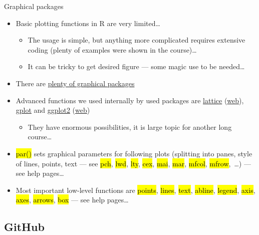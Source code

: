 \documentclass[compress, ucs, xelatex, 11pt, xcolor=svgnames,
	hyperref={
		bookmarks=true,
		unicode=true,
		colorlinks=true,
		pdftitle={Molecular data in R},
		plainpages=false,
		pdfauthor={Vojtech Zeisek},
		pdfsubject={Course about phylogeny and evolution in R},
		pdfcreator={XeLaTeX},
		pdfkeywords={R, evolution, phylogeny, molecular data},
		linkcolor=Tomato,
		anchorcolor=SaddleBrown,
		citecolor=Goldenrod,
		filecolor=DarkMagenta,
		menucolor=Sienna,
		urlcolor=DarkTurquoise,
		pdftex},
	url={hyphens, lowtilde} %
	]{beamer}
\renewcommand{\texttt}[1]{\hl{\ttfamily #1}}
\begin{document}
\begin{frame}{Graphical packages}
	\begin{itemize}
		\item Basic plotting functions in R are very limited\ldots
		\begin{itemize}
			\item The usage is simple, but anything more complicated requires extensive coding (plenty of examples were shown in the course)\ldots
			\item It can be tricky to get desired figure --- some magic use to be needed\ldots
		\end{itemize}
		\item There are \href{https://CRAN.R-project.org/web/views/Graphics.html}{plenty of graphical packages}
		\item Advanced functions we used internally by used packages are \href{https://CRAN.R-project.org/package=lattice}{lattice} (\href{http://lattice.r-forge.r-project.org/}{web}), \href{https://CRAN.R-project.org/package=gplots}{gplot} and \href{https://CRAN.R-project.org/package=ggplot2}{ggplot2} (\href{https://ggplot2.tidyverse.org/}{web})
		\begin{itemize}
			\item They have enormous possibilities, it is large topic for another long course\ldots
		\end{itemize}
		\item \texttt{par()} sets graphical parameters for following plots (splitting into panes, style of lines, points, text --- see \texttt{pch}, \texttt{lwd}, \texttt{lty}, \texttt{cex}, \texttt{mai}, \texttt{mar}, \texttt{mfcol}, \texttt{mfrow},~\ldots) --- see help pages\ldots
		\item Most important low-level functions are \texttt{points}, \texttt{lines}, \texttt{text}, \texttt{abline}, \texttt{legend}, \texttt{axis}, \texttt{axes}, \texttt{arrows}, \texttt{box} --- see help pages\ldots
	\end{itemize}
\end{frame}

\subsection{GitHub}
\end{document}
